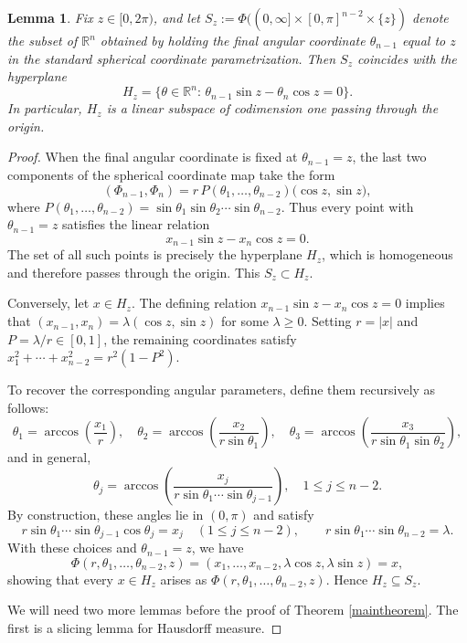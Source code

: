 \documentclass{article}
\newtheorem{lemma}[theorem]{Lemma}
\begin{document}
\begin{lemma}\label{hypersurface}
Fix $z \in [0,2\pi)$, and let $S_z := \Phi((0, \infty] \times[0, \pi]^{n-2} \times \{z\})$ denote the subset of $\mathbb{R}^n$
obtained by holding the final angular coordinate $\theta_{n-1}$ equal to $z$
in the standard spherical coordinate parametrization.
Then $S_z$ coincides with the hyperplane
\[
H_z = \bigl\{\theta \in \mathbb{R}^n :\,
\theta_{n-1}\sin z - \theta_n\cos z = 0 \bigr\}.
\]
In particular, $H_z$ is a linear subspace of codimension one passing through the origin.
\end{lemma}
\begin{proof}
When the final angular coordinate is fixed at $\theta_{n-1}=z$,
the last two components of the spherical coordinate map take the form
\[
(\Phi_{n-1},\Phi_n)
   = r\,P(\theta_1,\ldots,\theta_{n-2})
      \bigl(\cos z,\sin z\bigr),
\]
where $P(\theta_1,\ldots,\theta_{n-2})
      = \sin\theta_1\sin\theta_2\cdots\sin\theta_{n-2}$.
Thus every point with $\theta_{n-1}=z$ satisfies the linear relation
\[
x_{n-1}\sin z - x_n\cos z = 0.
\]
The set of all such points is precisely the hyperplane $H_z$,
which is homogeneous and therefore passes through the origin. This $S_z \subset H_z$.

Conversely, let $x \in H_z$.  The defining relation
$x_{n-1}\sin z - x_n\cos z = 0$ implies that
$(x_{n-1},x_n) = \lambda(\cos z,\sin z)$ for some $\lambda \ge 0$.
Setting $r = |x|$ and $P = \lambda/r \in [0,1]$, the remaining coordinates
satisfy $x_1^2 + \cdots + x_{n-2}^2 = r^2(1-P^2)$.

To recover the corresponding angular parameters, define them recursively as follows:
\[
\theta_1 = \arccos\!\left(\frac{x_1}{r}\right),
\quad
\theta_2 = \arccos\!\left(
   \frac{x_2}{r\sin\theta_1}
\right),
\quad
\theta_3 = \arccos\!\left(
   \frac{x_3}{r\sin\theta_1\sin\theta_2}
\right),
\]
and in general,
\[
\theta_j = \arccos\!\left(
   \frac{x_j}{r\sin\theta_1\cdots\sin\theta_{j-1}}
\right),
\quad
1 \le j \le n-2.
\]
By construction, these angles lie in $(0,\pi)$ and satisfy
\[
r\sin\theta_1\cdots\sin\theta_{j-1}\cos\theta_j = x_j
\quad (1 \le j \le n-2),
\qquad
r\sin\theta_1\cdots\sin\theta_{n-2} = \lambda.
\]
With these choices and $\theta_{n-1}=z$, we have
\[
\Phi(r,\theta_1,\ldots,\theta_{n-2},z)
   = (x_1,\ldots,x_{n-2},\lambda\cos z,\lambda\sin z)
   = x,
\]
showing that every $x\in H_z$ arises as
$\Phi(r,\theta_1,\ldots,\theta_{n-2},z)$.
Hence $H_z \subseteq S_z$.

We will need two more lemmas before the proof of Theorem \ref{maintheorem}. The first is a slicing lemma for Hausdorff measure.


\end{proof}
\end{document}
